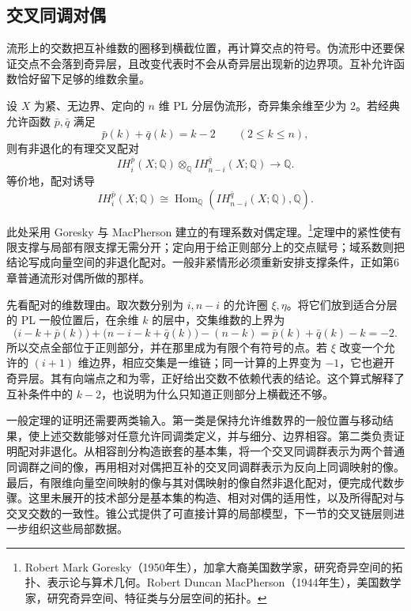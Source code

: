 \subsection{交叉同调对偶}
\label{g2:subsec:B03:04}

流形上的交数把互补维数的圈移到横截位置，再计算交点的符号。伪流形中还要保证交点不会落到奇异层，且改变代表时不会从奇异层出现新的边界项。互补允许函数恰好留下足够的维数余量。

\begin{theorem}\label{g2:thm:intersection-poincare-duality}
	设 \(X\) 为紧、无边界、定向的 \(n\) 维 PL 分层伪流形，奇异集余维至少为 \(2\)。若经典允许函数 \(\bar p,\bar q\) 满足
	\[
		\bar p(k)+\bar q(k)=k-2\qquad(2\le k\le n),
	\]
	则有非退化的有理交叉配对
	\[
		IH_i^{\bar p}(X;\mathbb Q)\otimes_{\mathbb Q}
		IH_{n-i}^{\bar q}(X;\mathbb Q)\longrightarrow\mathbb Q.
	\]
	等价地，配对诱导
	\[
		IH_i^{\bar p}(X;\mathbb Q)
		\cong\operatorname{Hom}_{\mathbb Q}(IH_{n-i}^{\bar q}(X;\mathbb Q),\mathbb Q).
	\]
\end{theorem}

此处采用 Goresky 与 MacPherson 建立的有理系数对偶定理\cite[第3.3节]{GoreskyMacPherson1980Intersection}。\footnote{Robert Mark Goresky（1950年生），加拿大裔美国数学家，研究奇异空间的拓扑、表示论与算术几何。Robert Duncan MacPherson（1944年生），美国数学家，研究奇异空间、特征类与分层空间的拓扑。}定理中的紧性使有限支撑与局部有限支撑无需分开；定向用于给正则部分上的交点赋号；域系数则把结论写成向量空间的非退化配对。一般非紧情形必须重新安排支撑条件，正如第6章普通流形对偶所做的那样。

\ProseParagraphBreak

先看配对的维数理由。取次数分别为 \(i,n-i\) 的允许圈 \(\xi,\eta\)。将它们放到适合分层的 PL 一般位置后，在余维 \(k\) 的层中，交集维数的上界为
\[
	\bigl(i-k+\bar p(k)\bigr)+\bigl(n-i-k+\bar q(k)\bigr)-(n-k)
	=\bar p(k)+\bar q(k)-k=-2.
\]
所以交点全部位于正则部分，并在那里成为有限个有符号的点。若 \(\xi\) 改变一个允许的 \((i+1)\) 维边界，相应交集是一维链；同一计算的上界变为 \(-1\)，它也避开奇异层。其有向端点之和为零，正好给出交数不依赖代表的结论。这个算式解释了互补条件中的 \(k-2\)，也说明为什么只知道正则部分上横截还不够。

\ProseParagraphBreak

一般定理的证明还需要两类输入。第一类是保持允许维数界的一般位置与移动结果，使上述交数能够对任意允许同调类定义，并与细分、边界相容。第二类负责证明配对非退化。\cite[第3.1--3.3节]{GoreskyMacPherson1980Intersection}从相容剖分构造嵌套的基本集，将一个交叉同调群表示为两个普通同调群之间的像，再用相对对偶把互补的交叉同调群表示为反向上同调映射的像。最后，有限维向量空间映射的像与其对偶映射的像自然非退化配对，便完成代数步骤。这里未展开的技术部分是基本集的构造、相对对偶的适用性，以及所得配对与交叉交数的一致性。锥公式提供了可直接计算的局部模型，下一节的交叉链层则进一步组织这些局部数据。

